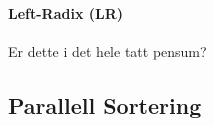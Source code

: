 \paragraph{\color{red}Left-Radix (LR)}
\color{red}Er dette i det hele tatt pensum?


\subsection{\color{red}Parallell Sortering}
